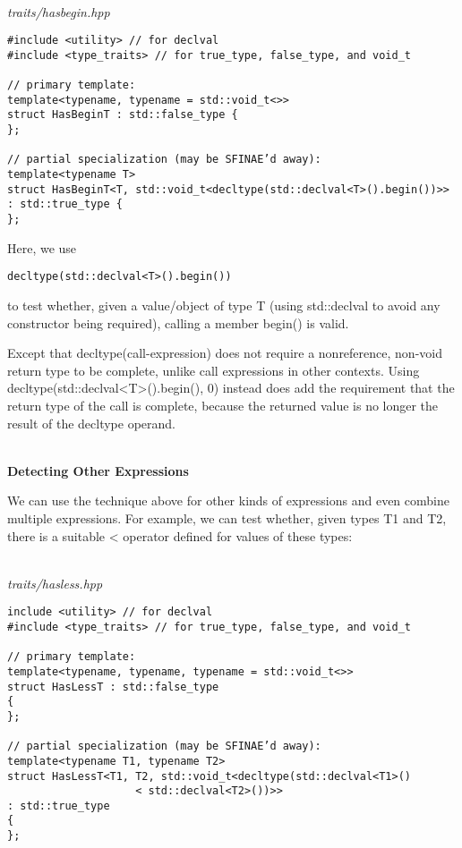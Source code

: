 \hspace*{\fill} \\ %
\noindent
\textit{traits/hasbegin.hpp}
\begin{lstlisting}[style=styleCXX]
#include <utility> // for declval
#include <type_traits> // for true_type, false_type, and void_t

// primary template:
template<typename, typename = std::void_t<>>
struct HasBeginT : std::false_type {
};

// partial specialization (may be SFINAE’d away):
template<typename T>
struct HasBeginT<T, std::void_t<decltype(std::declval<T>().begin())>>
: std::true_type {
};
\end{lstlisting}

Here, we use

\begin{lstlisting}[style=styleCXX]
decltype(std::declval<T>().begin())
\end{lstlisting}

to test whether, given a value/object of type T (using std::declval to avoid any constructor being required), calling a member begin() is valid.

\begin{tcolorbox}[colback=webgreen!5!white,colframe=webgreen!75!black]
\hspace*{0.75cm}Except that decltype(call-expression) does not require a nonreference, non-void return type to be complete, unlike call expressions in other contexts. Using decltype(std::declval<T>().begin(), 0) instead does add the requirement that the return type of the call is complete, because the returned value is no longer the result of the decltype operand.
\end{tcolorbox}

\hspace*{\fill} \\ %
\noindent
\textbf{Detecting Other Expressions}

We can use the technique above for other kinds of expressions and even combine multiple expressions. For example, we can test whether, given types T1 and T2, there is a suitable < operator defined for values of these types:

\hspace*{\fill} \\ %
\noindent
\textit{traits/hasless.hpp}
\begin{lstlisting}[style=styleCXX]
include <utility> // for declval
#include <type_traits> // for true_type, false_type, and void_t

// primary template:
template<typename, typename, typename = std::void_t<>>
struct HasLessT : std::false_type
{
};

// partial specialization (may be SFINAE’d away):
template<typename T1, typename T2>
struct HasLessT<T1, T2, std::void_t<decltype(std::declval<T1>()
					< std::declval<T2>())>>
: std::true_type
{
};
\end{lstlisting}


